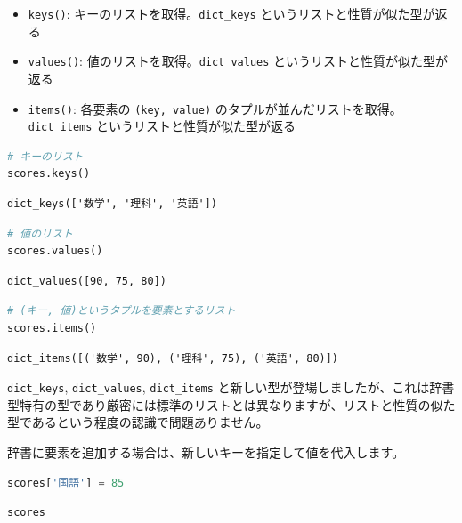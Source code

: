 \begin{itemize}
\item \texttt{keys()}: キーのリストを取得。\texttt{dict\_keys} というリストと性質が似た型が返る
\item \texttt{values()}: 値のリストを取得。\texttt{dict\_values} というリストと性質が似た型が返る
\item \texttt{items()}: 各要素の \texttt{(key, value)} のタプルが並んだリストを取得。\texttt{dict\_items} というリストと性質が似た型が返る
\end{itemize}


\begin{lstlisting}[style=codecell,language=Python]
# キーのリスト
scores.keys()
\end{lstlisting}

\begin{lstlisting}[style=outputcell]
dict_keys(['数学', '理科', '英語'])
\end{lstlisting}

\begin{lstlisting}[style=codecell,language=Python]
# 値のリスト
scores.values()
\end{lstlisting}

\begin{lstlisting}[style=outputcell]
dict_values([90, 75, 80])
\end{lstlisting}

\begin{lstlisting}[style=codecell,language=Python]
# (キー, 値)というタプルを要素とするリスト
scores.items()
\end{lstlisting}

\begin{lstlisting}[style=outputcell]
dict_items([('数学', 90), ('理科', 75), ('英語', 80)])
\end{lstlisting}

\texttt{dict\_keys}, \texttt{dict\_values}, \texttt{dict\_items} と新しい型が登場しましたが、これは辞書型特有の型であり厳密には標準のリストとは異なりますが、リストと性質の似た型であるという程度の認識で問題ありません。


辞書に要素を追加する場合は、新しいキーを指定して値を代入します。


\begin{lstlisting}[style=codecell,language=Python]
scores['国語'] = 85
\end{lstlisting}

\begin{lstlisting}[style=codecell,language=Python]
scores
\end{lstlisting}

